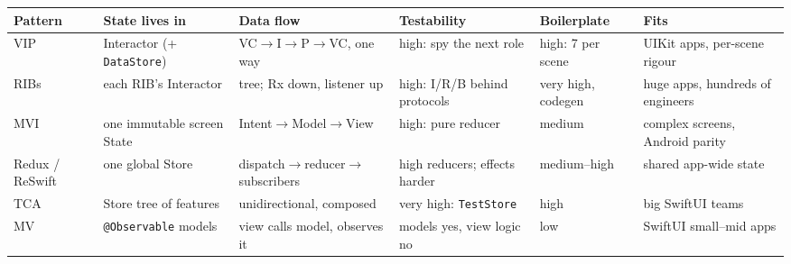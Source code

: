 \documentclass[8pt]{extarticle}
\begin{document}
\vspace{1pt}
{\footnotesize\setlength{\tabcolsep}{3pt}\renewcommand{\arraystretch}{1.05}
\noindent\begin{tabular}{@{}>{\raggedright\arraybackslash}p{17mm}>{\raggedright\arraybackslash}p{27mm}>{\raggedright\arraybackslash}p{30mm}>{\raggedright\arraybackslash}p{29mm}>{\raggedright\arraybackslash}p{21mm}>{\raggedright\arraybackslash}p{35mm}@{}}
\toprule
\textbf{Pattern} & \textbf{State lives in} & \textbf{Data flow} & \textbf{Testability} & \textbf{Boilerplate} & \textbf{Fits} \\
\midrule
VIP & Interactor (+ \texttt{DataStore}) & VC$\to$I$\to$P$\to$VC, one way & high: spy the next role & high: 7 per scene & UIKit apps, per-scene rigour \\
RIBs & each RIB's Interactor & tree; Rx down, listener up & high: I/R/B behind protocols & very high, codegen & huge apps, hundreds of engineers \\
MVI & one immutable screen State & Intent$\to$Model$\to$View & high: pure reducer & medium & complex screens, Android parity \\
Redux / ReSwift & one global Store & dispatch$\to$reducer$\to$subscribers & high reducers; effects harder & medium–high & shared app-wide state \\
TCA & Store tree of features & unidirectional, composed & very high: \texttt{TestStore} & high & big SwiftUI teams \\
MV & \texttt{@Observable} models & view calls model, observes it & models yes, view logic no & low & SwiftUI small–mid apps \\
\bottomrule
\end{tabular}}
\end{document}
